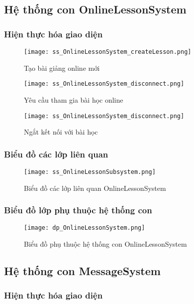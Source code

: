 \documentclass[./../main.tex]{subfiles}
\begin{document}
\subsection{Hệ thống con OnlineLessonSystem}
\subsubsection{Hiện thực hóa giao diện}
\begin{figure}[H]
    \centering
    \texttt{[image: ss\_OnlineLessonSystem\_createLesson.png]}
    \caption{Tạo bài giảng online mới}
    \label{ss_ols_cl}
\end{figure}

\begin{figure}[H]
    \centering
    \texttt{[image: ss\_OnlineLessonSystem\_disconnect.png]}
    \caption{Yêu cầu tham gia bài học online}
    \label{ss_ols_rjl}
\end{figure}

\begin{figure}[H]
    \centering
    \texttt{[image: ss\_OnlineLessonSystem\_disconnect.png]}
    \caption{Ngắt kết nối với bài học}
    \label{ss_ols_d}
\end{figure}
\subsubsection{Biểu đồ các lớp liên quan}
\begin{figure}[H]
    \centering
    \texttt{[image: ss\_OnlineLessonSubsystem.png]}
    \caption{Biểu đồ các lớp liên quan OnlineLessonSystem}
    \label{<label>}
\end{figure}
\subsubsection{Biểu đồ lớp phụ thuộc hệ thống con}
\begin{figure}[H]
    \centering
    \texttt{[image: dp\_OnlineLessonSystem.png]}
    \caption{Biểu đồ phụ thuộc hệ thống con OnlineLessonSystem}
    \label{dp_ols}
\end{figure}

\subsection{Hệ thống con MessageSystem}
\subsubsection{Hiện thực hóa giao diện}
\end{document}
